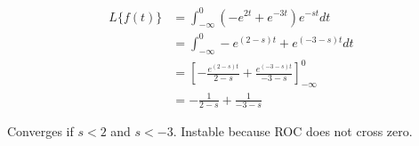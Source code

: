 \begin{align*}
    L\{f(t)\} &= \int_{-\infty}^0 \left( -e^{2t} + e^{-3t} \right) e^{-st} dt \\
    &= \int_{-\infty}^0 -e^{(2-s)t} + e^{(-3-s)t} dt \\
    &= \left[ -\frac{e^{(2-s)t}}{2-s} + \frac{e^{(-3-s)t}}{-3-s} \right]_{-\infty}^0\\
    &= -\frac{1}{2-s} + \frac{1}{-3-s}
\end{align*}

Converges if $s < 2$ and $s < -3$.
Instable because ROC does not cross zero.
